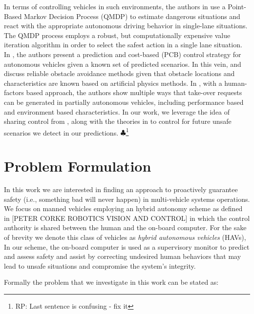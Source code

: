 \documentclass[letterpaper, 10 pt, conference]{ieeeconf}  %
\newcommand\RP[1]{$\clubsuit$\footnote{RP: #1}}
\begin{document}
In terms of controlling vehicles in such environments, the authors in \cite{qmdp} use a Point-Based Markov Decision Process (QMDP) to estimate dangerous situations and react with the appropriate autonomous driving behavior in single-lane situations. The QMDP process employs a robust, but computationally expensive value iteration algorithm in order to select the safest action in a single lane situation. In \cite{predcost}, the authors present a prediction and cost-based (PCB) control strategy for autonomous vehicles given a known set of predicted scenarios. In this vein, \cite{vfh+} and \cite{vfh*} discuss reliable obstacle avoidance methods given that obstacle locations and characteristics are known based on artificial physics methods. In \cite{takeover}, with a human-factors based approach, the authors show multiple ways that take-over requests can be generated in partially autonomous vehicles, including performance based and environment based characteristics. In our work, we leverage the idea of sharing control from \cite{takeover}, along with the theories in \cite{vfh*} to control for future unsafe scenarios we detect in our predictions. \RP{Last sentence is confusing - fix it}

    
\section{Problem Formulation} \label{sec:probform}
 
In this work we are interested in finding an approach to proactively guarantee safety (i.e., something bad will never happen) in multi-vehicle systems operations. We focus on manned vehicles employing an hybrid autonomy scheme as defined in \cite{}[PETER CORKE ROBOTICS VISION AND CONTROL] in which the control authority is shared between the human and the on-board computer. For the sake of brevity we denote this class of vehicles as {\em hybrid autonomous vehicles} (HAVs), In our scheme, the on-board computer is used as a supervisory monitor to predict and assess safety and assist by correcting undesired human behaviors that may lead to unsafe situations and compromise the system's integrity. 

Formally the problem that we investigate in this work can be stated as: 
\end{document}

